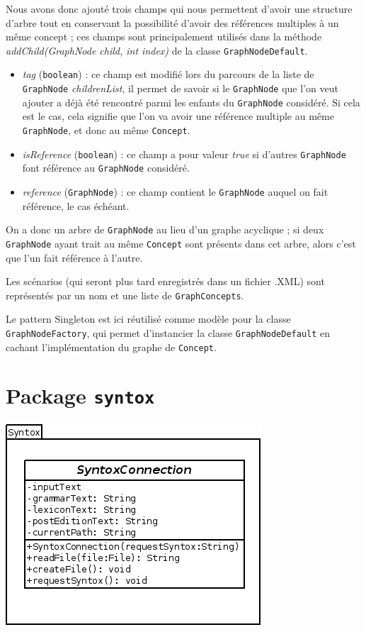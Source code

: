 \documentclass[12pt]{report}
\begin{document}
Nous avons donc ajouté trois champs qui nous permettent d'avoir une structure d'arbre tout en conservant la possibilité d'avoir des références multiples à un même concept ; ces champs sont principalement utilisés dans la méthode \emph{addChild(GraphNode child, int index)} de la classe \texttt{GraphNodeDefault}.
\begin{itemize}
\item \emph{tag} (\texttt{boolean}) : ce champ est modifié lors du parcours de la liste de \texttt{GraphNode} \emph{childrenList}, il permet de savoir si le \texttt{GraphNode} que l'on veut ajouter a déjà été rencontré parmi les enfants du \texttt{GraphNode} considéré. Si cela est le cas, cela signifie que l'on va avoir une référence multiple au même \texttt{GraphNode}, et donc au même \texttt{Concept}.
\item \emph{isReference} (\texttt{boolean}) : ce champ a pour valeur \emph{true} si d'autres \texttt{GraphNode} font référence au \texttt{GraphNode} considéré.
\item \emph{reference} (\texttt{GraphNode}) : ce champ contient le \texttt{GraphNode} auquel on fait référence, le cas échéant.
\end{itemize}

On a donc un arbre de \texttt{GraphNode} au lieu d'un graphe acyclique ; si deux \texttt{GraphNode} ayant trait au même \texttt{Concept} sont présents dans cet arbre, alors c'est que l'un fait référence à l'autre.

\bigskip 
Les scénarios (qui seront plus tard enregistrés dans un fichier .XML) sont représentés par un nom et une liste de \texttt{GraphConcepts}.

\bigskip
Le pattern Singleton est ici réutilisé comme modèle pour la classe \texttt{GraphNodeFactory}, qui permet d'instancier la classe \texttt{GraphNodeDefault} en cachant l'implémentation du graphe de \texttt{Concept}.

\section{Package \texttt{syntox}}
 
\begin{center}
\includegraphics[scale=0.6]{diversuml/SyntoxConnection.png}
\end{center}
\end{document}
